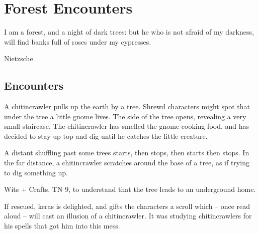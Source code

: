 \chapter{Forest Encounters}

\epigraph{I am a forest, and a night of dark trees: but he who is not afraid of my darkness, will find banks full of roses under my cypresses.}{Nietzsche}

\renewcommand{\sqarea}{Forest}

\sqtoc

\setcounter{enc}{0}

\section{Encounters}

\begin{multicols}{2}

\label{interruptions}

\sqminitoc


A chitincrawler pulls up the earth by a tree.  Shrewd characters might spot that under the tree a little gnome lives.  The side of the tree opens, revealing a very small staircase.  The chitincrawler has smelled the gnome cooking food, and has decided to stay up top and dig until he catches the little creature.

\begin{boxtext}

	A distant shuffling past some trees starts, then stops, then starts then stops.
	In the far distance, a chitincrawler scratches around the base of a tree, as if trying to dig something up.

\end{boxtext}

Wits + Crafts, TN 9, to understand that the tree leads to an underground home.

\chitincrawler


\gnomishillusionist

If rescued, \gls{keras} is delighted, and gifts the characters a scroll which -- once read aloud -- will cast an illusion of a chitincrawler.  It was studying chitincrawlers for his spells that got him into this mess.


\end{multicols}
